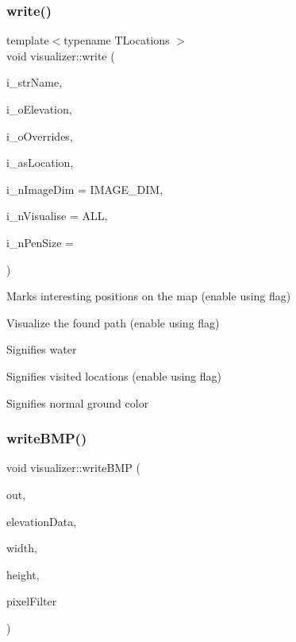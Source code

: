 \subsubsection{\texorpdfstring{write()}{write()}}
{\footnotesize\ttfamily template$<$typename T\+Locations $>$ \\
void visualizer\+::write (\begin{DoxyParamCaption}\item[{std\+::string}]{i\+\_\+str\+Name,  }\item[{uint8\+\_\+t $\ast$}]{i\+\_\+o\+Elevation,  }\item[{uint8\+\_\+t $\ast$}]{i\+\_\+o\+Overrides,  }\item[{std\+::vector$<$ T\+Locations $>$}]{i\+\_\+as\+Location,  }\item[{int}]{i\+\_\+n\+Image\+Dim = {\ttfamily IMAGE\+\_\+DIM},  }\item[{int}]{i\+\_\+n\+Visualise = {\ttfamily ALL},  }\item[{int}]{i\+\_\+n\+Pen\+Size = {} }\end{DoxyParamCaption})}

Marks interesting positions on the map (enable using flag)

Visualize the found path (enable using flag)

Signifies water

Signifies visited locations (enable using flag)

Signifies normal ground color \mbox{\label{namespacevisualizer_ab4e649cd7413a51ac1ae4b31a2994c3a}} 
\subsubsection{\texorpdfstring{write\+B\+M\+P()}{writeBMP()}}
{\footnotesize\ttfamily void visualizer\+::write\+B\+MP (\begin{DoxyParamCaption}\item[{std\+::ostream \&}]{out,  }\item[{const uint8\+\_\+t $\ast$}]{elevation\+Data,  }\item[{size\+\_\+t}]{width,  }\item[{size\+\_\+t}]{height,  }\item[{std\+::function$<$ uint8\+\_\+t(size\+\_\+t, size\+\_\+t, uint8\+\_\+t)$>$}]{pixel\+Filter }\end{DoxyParamCaption})}

